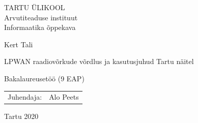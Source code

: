 \documentclass[12pt]{article}
\begin{document}
    \thispagestyle{empty}
    \begin{center}


        \large
        TARTU ÜLIKOOL\\
        Arvutiteaduse instituut\\
        Informaatika õppekava\\[2mm]


        \vspace{25mm}

        \Large Kert Tali

        \vspace{4mm}

        \huge LPWAN raadiovõrkude võrdlus ja kasutusjuhud Tartu näitel

        \vspace{20mm}

        \Large Bakalaureusetöö (9 EAP)

    \end{center}

    \vspace{2mm}

    \begin{flushright}
    {
        \setlength{\extrarowheight}{5pt}
        \begin{tabular}{r l}
            \sffamily Juhendaja: & \sffamily Alo Peets \\
        \end{tabular}
    }
    \end{flushright}

    \vspace{10mm}

    \vfill
    \centerline{Tartu 2020}




    \newpage
\end{document}
